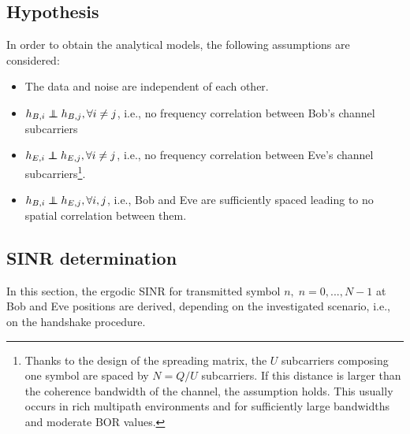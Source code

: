 \documentclass[12pt, draftclsnofoot, onecolumn]{IEEEtran}
\newcommand\independent{\protect\mathpalette{\protect\independenT}{\perp}}
\def\independenT#1#2{\mathrel{\rlap{$#1#2$}\mkern2mu{#1#2}}}
\begin{document}

\subsection{Hypothesis}
In order to obtain the analytical models, the following assumptions are considered:
\begin{itemize}
	\item The data and noise are independent of each other. 
	\item $h_{B,i} \independent h_{B,j}, \forall i \neq j$, i.e., no frequency correlation between Bob's channel subcarriers
	\item $h_{E,i} \independent h_{E,j}, \forall i \neq j$, i.e., no frequency correlation between Eve's channel subcarriers\footnote{Thanks to the design of the spreading matrix, the $U$ subcarriers composing one symbol are spaced by $N = Q/U$ subcarriers. If this distance is larger than the coherence bandwidth of the channel, the assumption holds. This usually occurs in rich multipath environments and for sufficiently large bandwidths and moderate BOR values.}.
	\item $h_{B,i} \independent h_{E,j}, \forall i,j$, i.e., Bob and Eve are sufficiently spaced leading to no spatial correlation between them.
\end{itemize}


\subsection{SINR determination}
In this section, the ergodic SINR for transmitted symbol $n, \; n = 0,...,N-1$ at Bob and Eve positions are derived, depending on the investigated scenario, i.e., on the handshake procedure. 



\end{document}
